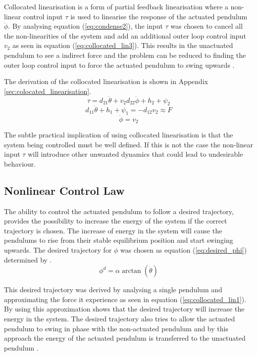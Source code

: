 Collocated linearisation is a form of partial feedback linearisation where a non-linear control input $\tau$ is used to linearise the response of the actuated pendulum $\ddot{\phi}$. By analysing equation (\ref{eq:condense2}), the input $\tau$ was chosen to cancel all the non-linearities of the system and add an additional outer loop control input $v_{2}$ as seen in equation (\ref{eq:collocated_lin3}). This results in the unactuated pendulum to see a indirect force and the problem can be reduced to finding the outer loop control input to force the actuated pendulum to swing upwards \citep{spong_swingup}.

 The derivation of the collocated linearisation is shown in Appendix \ref{sec:colocated_linearisation}.
\begin{equation} \label{eq:collocated_lin3}
\tau = d_{21}\ddot{\theta} + v_{2}d_{22}\ddot{\phi} + h_{2} + \psi_{2}
\end{equation}
\begin{equation} \label{eq:collocated_lin1}
d_{11}\ddot{\theta} + h_{1} + \psi_{1} = -d_{12}v_{2} \approx F
\end{equation}
\begin{equation} \label{eq:collocated_lin2}
\ddot{\phi} = v_{2}
\end{equation}

The subtle practical implication of using collocated linearisation is that the system being controlled must be well defined. If this is not the case the non-linear input $\tau$ will introduce other unwanted dynamics that could lead to undesirable behaviour.

\subsection{Nonlinear Control Law}

The ability to control the actuated pendulum to follow a desired trajectory, provides the possibility to increase the energy of the system if the correct trajectory is chosen. The increase of energy in the system will cause the pendulums to rise from their stable equilibrium position and start swinging upwards. The desired trajectory for ${\phi}$ was chosen as equation (\ref{eq:desired_phi}) determined by \citet{spong_swingup}.
\begin{equation} \label{eq:desired_phi}
\phi^{d} =  \alpha \arctan(\dot{\theta})
\end{equation}

This desired trajectory was derived by analysing a single pendulum and approximating the force it experience as seen in equation (\ref{eq:collocated_lin1}). By using this approximation \citet{spong_swingup} shows that the desired trajectory will increase the energy in the system. The desired trajectory also tries to allow the actuated pendulum to swing in phase with the non-actuated pendulum and by this approach the energy of the actuated pendulum is transferred to the unactuated pendulum \citep{spong_swingup}.\\

